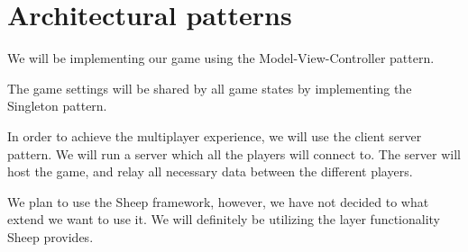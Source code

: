 \section{Architectural patterns} 
\label{architecturalpatterns}

We will be implementing our game using the Model-View-Controller pattern. 

The game settings will be shared by all game states by implementing the Singleton pattern. 

In order to achieve the multiplayer experience, we will use the client server pattern. We will run a server which all the players will connect to. The server will host the game, and relay all necessary data between the different players. 

We plan to use the Sheep framework, however, we have not decided to what extend we want to use it. We will definitely be utilizing the layer functionality Sheep provides.